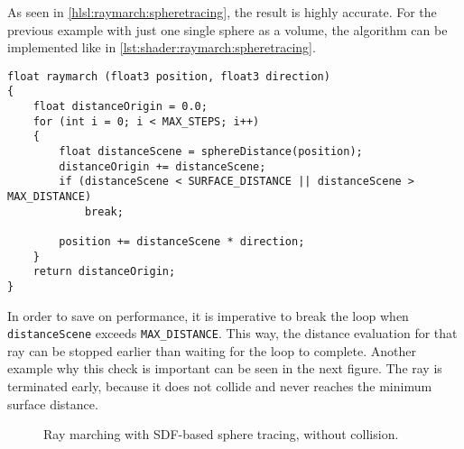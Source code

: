 \noindent
As seen in \autoref{hlsl:raymarch:spheretracing}, the result is highly accurate.
For the previous example with just one single sphere as a volume, the algorithm can be implemented like in \autoref{lst:shader:raymarch:spheretracing}.

\begin{lstlisting}[language=HLSL, caption=Implementation of ray marching with sphere tracing., label=lst:shader:raymarch:spheretracing]
float raymarch (float3 position, float3 direction)
{
    float distanceOrigin = 0.0;
    for (int i = 0; i < MAX_STEPS; i++)
    {
        float distanceScene = sphereDistance(position);
        distanceOrigin += distanceScene;
        if (distanceScene < SURFACE_DISTANCE || distanceScene > MAX_DISTANCE)
            break;

        position += distanceScene * direction;
    }
    return distanceOrigin;
}
\end{lstlisting}

\noindent
In order to save on performance, it is imperative to break the loop when \lstinline[language=HLSL]{distanceScene} exceeds \lstinline[language=HLSL]{MAX_DISTANCE}. This way, the distance evaluation for that ray can be stopped earlier than waiting for the loop to complete.
Another example why this check is important can be seen in the next figure. The ray is terminated early, because it does not collide and never reaches the minimum surface distance.
\begin{figure}[H]
    \centering
    \caption{Ray marching with SDF-based sphere tracing, without collision.}
\end{figure}


